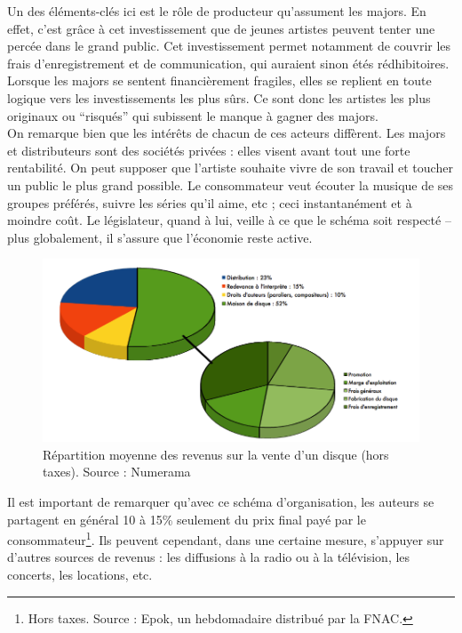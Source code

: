 \documentclass[a4paper]{report}
\begin{document}
	Un des éléments-clés ici est le rôle de producteur qu'assument les majors. En effet, c'est grâce à cet investissement que de jeunes artistes peuvent tenter une percée dans le grand public. Cet investissement permet notamment de couvrir les frais d'enregistrement et de communication, qui auraient sinon étés rédhibitoires. Lorsque les majors se sentent financièrement fragiles, elles se replient en toute logique vers les investissements les plus sûrs. Ce sont donc les artistes les plus originaux ou ``risqués'' qui subissent le manque à gagner des majors.\\

	On remarque bien que les intérêts de chacun de ces acteurs diffèrent. Les majors et distributeurs sont des sociétés privées : elles visent avant tout une forte rentabilité. On peut supposer que l'artiste souhaite vivre de son travail et toucher un public le plus grand possible. Le consommateur veut écouter la musique de ses groupes préférés, suivre les séries qu'il aime, etc ; ceci instantanément et à moindre coût. Le législateur, quand à lui, veille à ce que le schéma soit respecté – plus globalement, il s'assure que l'économie reste active.

	\begin{figure}[ht]
		\includegraphics[width=13cm]{images/repartition-des-revenus.png}
		\caption{Répartition moyenne des revenus sur la vente d'un disque (hors taxes). Source : Numerama}
	\end{figure}

	Il est important de remarquer qu'avec ce schéma d'organisation, les auteurs se partagent en général 10 à 15\% seulement du prix final payé par le consommateur\footnote{Hors taxes. Source : Epok, un hebdomadaire distribué par la FNAC.}. Ils peuvent cependant, dans une certaine mesure, s'appuyer sur d'autres sources de revenus : les diffusions à la radio ou à la télévision, les concerts, les locations, etc.
\end{document}
